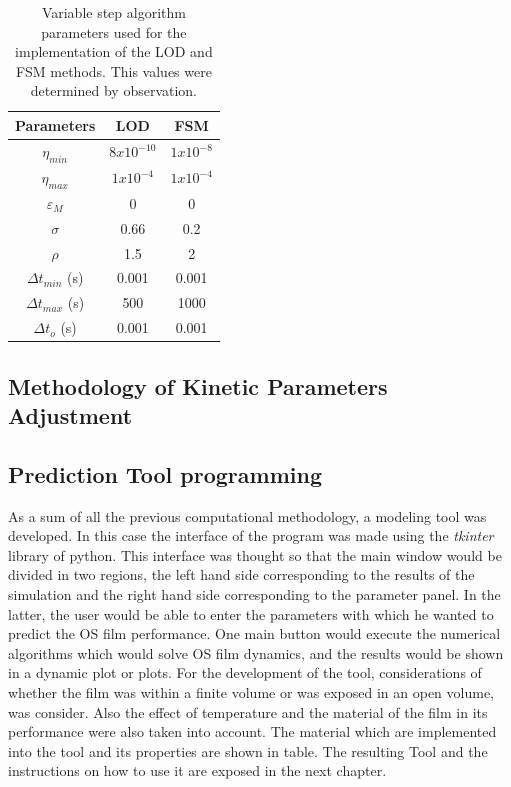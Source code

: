 \begin{refsection}
\begin{table}[H]
\centering
\caption{Variable step algorithm parameters used for the implementation of  the LOD and FSM methods. This values were determined by observation.}
\label{tab:parameters_vari_time _Step}
\begin{tabular}{|c|c|c|}
\hline
Parameters             & LOD          & FSM         \\ \hline
$\eta_{min}$           & $8x10^{-10}$ & $1x10^{-8}$ \\ \hline
$\eta_{max}$           & $1x10^{-4}$  & $1x10^{-4}$ \\ \hline
$\varepsilon_M$        & 0            & 0           \\ \hline
$\sigma$               & 0.66         & 0.2         \\ \hline
$\rho$                 & 1.5          & 2           \\ \hline
$\Delta   t_{min}$ (s) & 0.001        & 0.001       \\ \hline
$\Delta   t_{max}$ (s) & 500          & 1000        \\ \hline
$\Delta t_o$   (s)     & 0.001        & 0.001       \\ \hline
\end{tabular}%
\end{table}


\subsection{Methodology of Kinetic Parameters Adjustment}\label{subsec:parameters_adjustment_meth}





\subsection{Prediction Tool programming}
As a sum of all the previous computational methodology, a modeling tool was developed. In this case the interface of the program was made using the \textit{tkinter} library of python. This interface was thought so that the main window would be divided in two regions, the left hand side corresponding to the results of the simulation and the right hand side corresponding to the parameter panel. In the latter, the user would be able to enter the parameters with which he wanted to predict the OS film performance. One main button would execute the numerical algorithms which  would solve OS film dynamics, and the results would be shown in a dynamic plot or plots. For the development of the tool, considerations of whether the film was within a finite volume or was exposed in an open volume, was consider. Also the effect of temperature and the material of the film in its performance were also taken into account.  The material which are implemented into the tool and its properties are shown in table. The resulting Tool and the instructions on how to use it are exposed in the next chapter. 


\end{refsection}
